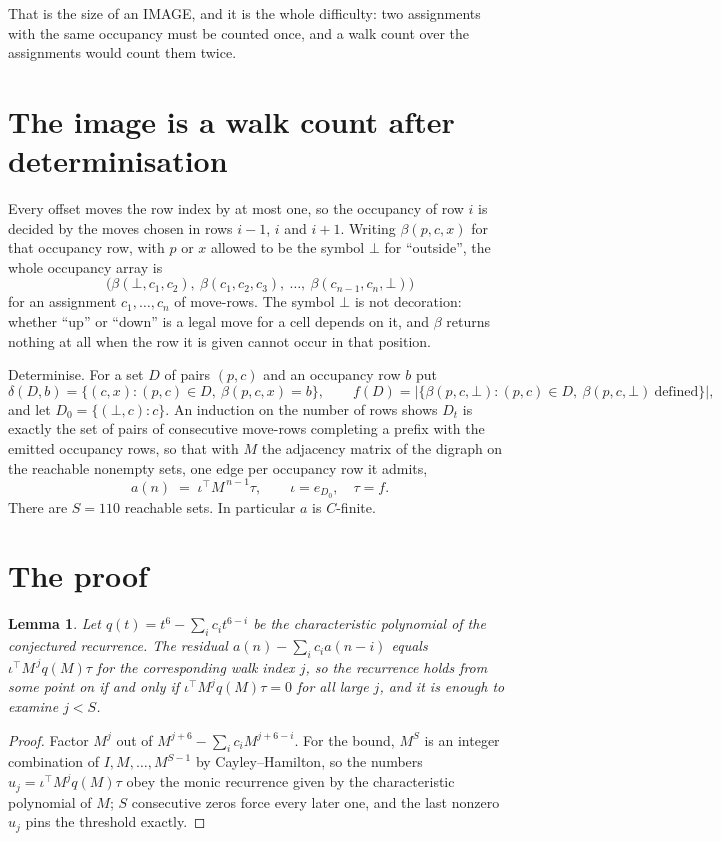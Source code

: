 \documentclass[11pt,a4paper]{article}
\theoremstyle{plain}
\newtheorem{lemma}[theorem]{Lemma}
\theoremstyle{definition}
\begin{document}
That is the size of an IMAGE, and it is the whole difficulty: two assignments with the same
occupancy must be counted once, and a walk count over the assignments would count them twice.

\section{The image is a walk count after determinisation}

Every offset moves the row index by at most one, so the occupancy of row $i$ is decided by the
moves chosen in rows $i-1$, $i$ and $i+1$. Writing $\beta(p,c,x)$ for that occupancy row, with
$p$ or $x$ allowed to be the symbol $\bot$ for ``outside'', the whole occupancy array is
\[
\bigl(\beta(\bot,c_1,c_2),\ \beta(c_1,c_2,c_3),\ \dots,\ \beta(c_{n-1},c_n,\bot)\bigr)
\]
for an assignment $c_1,\dots,c_n$ of move-rows. The symbol $\bot$ is not decoration: whether
``up'' or ``down'' is a legal move for a cell depends on it, and $\beta$ returns nothing at all
when the row it is given cannot occur in that position.

Determinise. For a set $D$ of pairs $(p,c)$ and an occupancy row $b$ put
\[
\delta(D,b)=\{(c,x):(p,c)\in D,\ \beta(p,c,x)=b\},\qquad
f(D)=\bigl|\{\beta(p,c,\bot):(p,c)\in D,\ \beta(p,c,\bot)\ \text{defined}\}\bigr| ,
\]
and let $D_0=\{(\bot,c):c\}$. An induction on the number of rows shows $D_t$ is exactly the
set of pairs of consecutive move-rows completing a prefix with the emitted occupancy rows, so
that with $M$ the adjacency matrix of the digraph on the reachable nonempty sets, one edge per
occupancy row it admits,
\[
a(n)\;=\;\iota^{\!\top}M^{\,n-1}\tau,\qquad \iota=e_{D_0},\quad \tau=f .
\]
There are $S=110$ reachable sets. In particular $a$ is $C$-finite.

\section{The proof}

\begin{lemma}\label{lem:crit}
Let $q(t)=t^{6}-\sum_i c_it^{6-i}$ be the characteristic polynomial of the
conjectured recurrence. The residual $a(n)-\sum_ic_ia(n-i)$ equals
$\iota^{\!\top}M^{\,j}q(M)\tau$ for the corresponding walk index $j$, so the recurrence
holds from some point on if and only if $\iota^{\!\top}M^{j}q(M)\tau=0$ for all large $j$,
and it is enough to examine $j<S$.
\end{lemma}

\begin{proof}
Factor $M^{j}$ out of $M^{j+6}-\sum_ic_iM^{j+6-i}$. For the bound, $M^{S}$
is an integer combination of $I,M,\dots,M^{S-1}$ by Cayley--Hamilton, so the numbers
$u_j=\iota^{\!\top}M^{j}q(M)\tau$ obey the monic recurrence given by the characteristic
polynomial of $M$; $S$ consecutive zeros force every later one, and the last nonzero $u_j$
pins the threshold exactly.
\end{proof}
\end{document}
